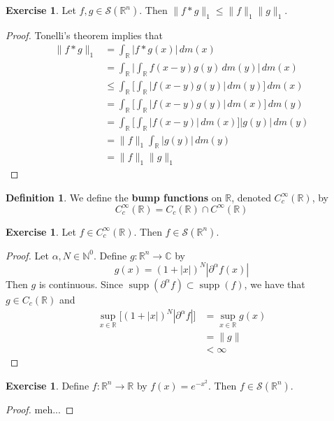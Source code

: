 \documentclass{book}
\theoremstyle{definition}
\newtheorem{defn}[definition]{Definition}
\newtheorem{ex}[definition]{Exercise}
\newcommand{\al}{\alpha}
\newcommand{\C}{\mathbb{C}}
\newcommand{\N}{\mathbb{N}}
\newcommand{\R}{\mathbb{R}}
\newcommand{\MS}{\mathcal{S}}
\DeclareMathOperator{\supp}{supp}
\DeclareMathOperator*{\0}{\mbf{0}}
\DeclareMathOperator*{\1}{\mbf{1}}
\newcommand{\p}{\partial}
\newcommand{\dm}{\, d m}
\begin{document}
	\begin{ex}
		Let $f,g \in \MS(\R^n)$. Then $\|f*g\|_1 \leq \|f\|_1\|g\|_1$.
	\end{ex}

	\begin{proof}
		Tonelli's theorem implies that 
		\begin{align*}
			\|f*g\|_1
			& = \int_{\R} |f*g(x)| \dm(x) \\
			& = \int_{\R}  \bigg|\int_{\R} f(x-y)g(y) \dm(y) \bigg|  \dm(x) \\
			& \leq  \int_{\R} \bigg[ \int_{\R} |f(x-y)g(y)| \dm(y) \bigg] \dm(x) \\
			& = \int_{\R} \bigg[ \int_{\R} |f(x-y)g(y)| \dm(x) \bigg] \dm(y) \\
			& = \int_{\R} \bigg[ \int_{\R} |f(x-y)| \dm(x) \bigg] |g(y)| \dm(y) \\
			& = \|f\|_1 \int_{\R} |g(y)| \dm(y) \\
			& = \|f\|_1\|g\|_1
		\end{align*}
	\end{proof}

	\begin{defn}
		We define the \textbf{bump functions} on $\R$, denoted $C_c^{\infty}(\R)$,  by $$C_c^{\infty}(\R) = C_c(\R) \cap C^{\infty}(\R)$$
	\end{defn}

	\begin{ex}
		Let $f \in C_c^{\infty}(\R)$. Then $f \in \MS(\R^n)$. 
	\end{ex}

	\begin{proof}
		Let $\al,N \in \N^0$. Define $g: \R^n \rightarrow \C$ by 
		$$g(x) = (1+|x|)^N |\p^{\al}f(x)|$$ 
		Then $g$ is continuous. Since $\supp(\p^{\al}f) \subset \supp(f)$, we have that $g \in C_c(\R)$ and
		\begin{align*}
			\sup_{x \in \R} \bigg[ (1+|x|)^N |\p^{\al}f|\bigg] 
			& = \sup_{x \in \R} g(x) \\
			& = \|g\| \\
			& < \infty
		\end{align*}
	\end{proof}

	\begin{ex}
		Define $f:\R^n \rightarrow \R$ by $f(x) = e^{-x^2}$. Then $f \in \MS(\R^n)$.
	\end{ex}
	
	\begin{proof}
		meh...
	\end{proof}
	
\end{document}
